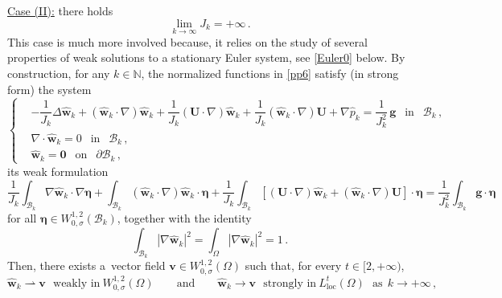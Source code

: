 \documentclass[11pt]{article}
\numberwithin{equation}{section}
\numberwithin{figure}{section}
\def\bbe{{\boldsymbol{\eta}}}
\def\0{{\mathbf 0}}
\begin{document}
\underline{Case (II):} there holds
$$\lim\limits_{k\to \infty} J_k = +\infty \, .$$
This case is much more involved because, it relies on the study of several properties of weak solutions to a stationary Euler system, see \eqref{Euler0} below.
By construction, for any $k \in \mathbb{N}$, the normalized functions in \eqref{pp6} satisfy (in strong form) the system
\begin{equation} \label{NS-Ek}
	\left\{
\begin{aligned}
	& - \dfrac{1}{J_k} \Delta \widehat{\mathbf{w}}_k + (\widehat{\mathbf{w}}_k \cdot \nabla) \widehat{\mathbf{w}}_k + \dfrac{1}{J_k}(\mathbf{U} \cdot \nabla) \widehat{\mathbf{w}}_k + \dfrac{1}{J_k}(\widehat{\mathbf{w}}_k \cdot \nabla) \mathbf{U} + \nabla \widehat{p}_k = \dfrac{1}{J^{2}_{k}} \, \mathbf{g} \ \ \mbox{ in } \ \ \mathcal{B}_k \, , \\[4pt]
	& \nabla \cdot \widehat{\mathbf{w}}_k = 0 \ \ \mbox{ in } \ \ \mathcal{B}_k \, , \\[4pt]
	&\widehat{\mathbf{w}}_k = \0 \ \ \mbox{ on } \ \ \partial \mathcal{B}_k \, ,
\end{aligned}
\right.
\end{equation}
its weak formulation
\begin{equation} \label{weaksolutionshnormalized}
\dfrac{1}{J_k} \int_{\mathcal{B}_k} \nabla \widehat{\mathbf{w}}_k \cdot \nabla \bbe + \int_{\mathcal{B}_k} (\widehat{\mathbf{w}}_k \cdot
\nabla)\widehat{\mathbf{w}}_k \cdot \bbe + \dfrac{1}{J_k} \int_{\mathcal{B}_k} [(\mathbf{U} \cdot \nabla) \widehat{\mathbf{w}}_k +
(\widehat{\mathbf{w}}_k \cdot \nabla) \mathbf{U}] \cdot \bbe = \dfrac{1}{J^{2}_{k}} \int_{\mathcal{B}_k} \mathbf{g} \cdot \bbe
\end{equation}
for all $\bbe \in W^{1,2}_{0, \sigma}(\mathcal{B}_k)$, together with the identity
\begin{equation} \label{hatu-1}
	\int_{  \mathcal{B}_{k}} | \nabla \widehat{\mathbf{w}}_k |^2 = \int_{\Omega} | \nabla \widehat{\mathbf{w}}_k |^2 =1 \, .
\end{equation}
Then, there exists a~vector field $\mathbf{v} \in W_{0,\sigma}^{1,2}(\Omega)$ such that, for every $t \in [2, +\infty)$,
\begin{equation} \label{wksconv2}
	\widehat{\mathbf{w}}_k \rightharpoonup \mathbf{v} \ \ \ \text{weakly in} \ W_{0,\sigma}^{1,2}(\Omega) \qquad \text{and} \qquad \widehat{\mathbf{w}}_k \to \mathbf{v} \ \ \ \text{strongly in} \ L_{\text{loc}}^{t}(\Omega) \ \ \ \text{as} \ \ k \to +\infty \, ,
\end{equation}
\end{document}
